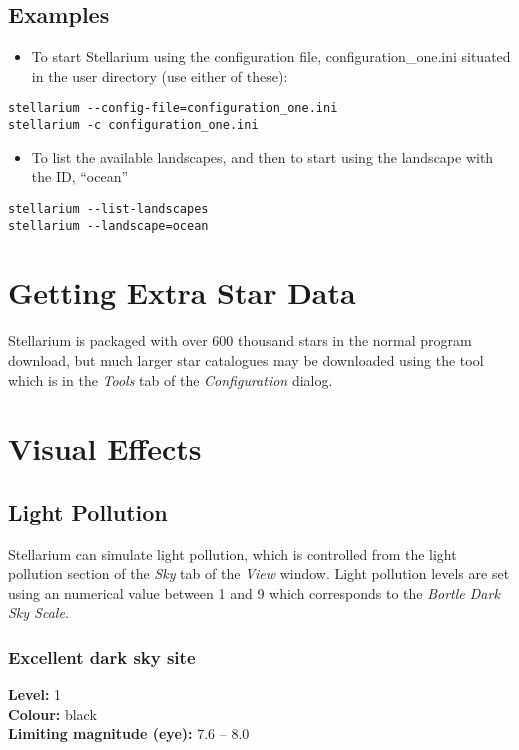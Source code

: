 \subsection{Examples}\label{examples}

\begin{itemize}
\item
  To start Stellarium using the configuration file,
  configuration\_one.ini situated in the user directory (use either of
  these):
\end{itemize}

\texttt{stellarium~-\/-config-file=configuration\_one.ini}\\
\texttt{stellarium~-c~configuration\_one.ini}

\begin{itemize}
\item
  To list the available landscapes, and then to start using the
  landscape with the ID, ``ocean''
\end{itemize}

\texttt{stellarium~-\/-list-landscapes}\\
\texttt{stellarium~-\/-landscape=ocean}

\section{Getting Extra Star Data}\label{getting-extra-star-data}

Stellarium is packaged with over 600 thousand stars in the normal
program download, but much larger star catalogues may be downloaded
using the tool which is in the \emph{Tools} tab of the
\emph{Configuration} dialog.

\section{Visual Effects}\label{visual-effects}

\subsection{Light Pollution}\label{light-pollution}

Stellarium can simulate light pollution, which is controlled from the
light pollution section of the \emph{Sky} tab of the \emph{View} window.
Light pollution levels are set using an numerical value between 1 and 9
which corresponds to the \emph{Bortle Dark Sky Scale}.

\subsubsection{Excellent dark sky site}
\textbf{Level:} 1 \\
\textbf{Colour:} black \\
\textbf{Limiting magnitude (eye):} 7.6 -- 8.0

